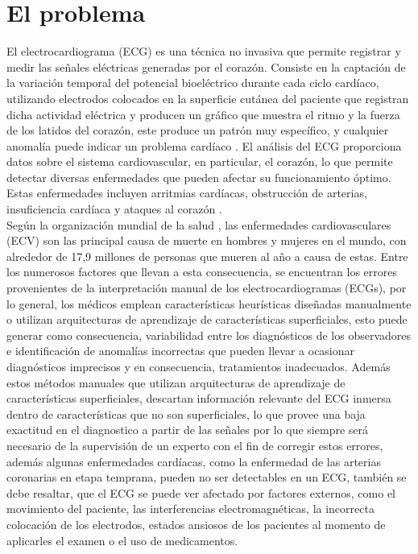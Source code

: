 \documentclass[spanish,11pt,letterpaper,oneside]{memoir}
\begin{document}
\chapter{El problema}
	El electrocardiograma (ECG) es una técnica no invasiva que permite registrar y medir las señales eléctricas generadas por el corazón. Consiste en la captación de la variación temporal del potencial bioeléctrico durante cada ciclo cardíaco, utilizando electrodos colocados en la superficie cutánea del paciente que registran dicha actividad eléctrica y producen un gráfico que muestra el ritmo y la fuerza de los latidos del corazón, este produce un patrón muy específico, y cualquier anomalía puede indicar un problema cardíaco \cite{ZHANG2021113}. El análisis del ECG proporciona datos sobre el sistema cardiovascular, en particular, el corazón, lo que permite detectar diversas enfermedades que pueden afectar su funcionamiento óptimo. Estas enfermedades incluyen arritmias cardíacas, obstrucción de arterias, insuficiencia cardíaca y ataques al corazón \cite{MedlineECG}. \\ Según la organización mundial de la salud \cite{Who}, las enfermedades cardiovasculares (ECV) son las principal causa de muerte en hombres y mujeres en el mundo, con alrededor de 17,9 millones de personas que mueren al año a causa de estas. Entre los numerosos factores que llevan a esta consecuencia, se encuentran los errores provenientes de la interpretación manual de los electrocardiogramas (ECGs), por lo general, los médicos emplean características heurísticas diseñadas manualmente o utilizan arquitecturas de aprendizaje de características superficiales, esto puede generar como consecuencia, variabilidad entre los diagnósticos de los observadores e identificación de anomalías incorrectas que pueden llevar a ocasionar diagnósticos imprecisos y en consecuencia, tratamientos inadecuados. Además estos métodos manuales que utilizan arquitecturas de aprendizaje de características superficiales, descartan información relevante del ECG inmersa dentro de características que no son superficiales, lo que provee una baja exactitud en el diagnostico a partir de las señales por lo que siempre será necesario de la supervisión de un experto con el fin de corregir estos errores, además algunas enfermedades cardíacas, como la enfermedad de las arterias coronarias en etapa temprana, pueden no ser detectables en un ECG, también se debe resaltar, que el ECG se puede ver afectado por factores externos, como el movimiento del paciente, las interferencias electromagnéticas, la incorrecta colocación de los electrodos, estados ansiosos de los pacientes al momento de aplicarles el examen o el uso de medicamentos.
\end{document}
